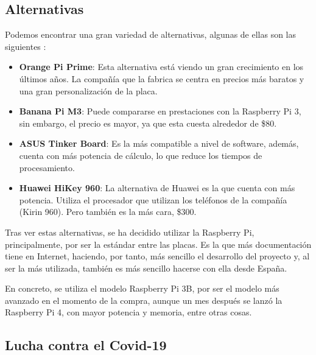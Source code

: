        \subsection{Alternativas} %
        \label{sub:AlternativasRaspberryPi}

            Podemos encontrar una gran variedad de alternativas, algunas de ellas son las
            siguientes \cite{alternativas_raspberry_pi}:

            \begin{itemize}
                \item \textbf{Orange Pi Prime}: Esta alternativa está viendo un gran crecimiento en los últimos años. La
                compañía que la fabrica se centra en precios más baratos y una gran personalización de la placa.
                \item \textbf{Banana Pi M3}: Puede compararse en prestaciones con la Raspberry Pi 3, sin embargo, el
                precio es mayor, ya que esta cuesta alrededor de \$80.
                \item \textbf{ASUS Tinker Board}: Es la más compatible a nivel de software, además, cuenta con más
                potencia de cálculo, lo que reduce los tiempos de procesamiento.
                \item \textbf{Huawei HiKey 960}: La alternativa de Huawei es la que cuenta con más potencia. Utiliza el
                procesador que utilizan los teléfonos de la compañía (Kirin 960). Pero también es la más cara, \$300.
            \end{itemize}

            Tras ver estas alternativas, se ha decidido utilizar la Raspberry Pi, principalmente, por ser la estándar
            entre las placas. Es la que más documentación tiene en Internet, haciendo, por tanto, más sencillo el
            desarrollo del proyecto y, al ser la más utilizada, también es más sencillo hacerse con ella desde
            España.

            En concreto, se utiliza el modelo Raspberry Pi 3B, por ser el modelo más avanzado en el momento de la compra,
            aunque un mes después se lanzó la Raspberry Pi 4, con mayor potencia y memoria, entre otras cosas.


        \subsection{Lucha contra el Covid-19} %
        \label{sub:LuchaContraElCovid-19}

